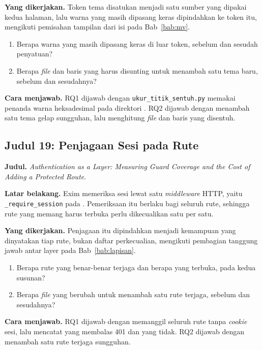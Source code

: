 \textbf{Yang dikerjakan.} Token tema disatukan menjadi satu sumber yang
dipakai kedua halaman, lalu warna yang masih dipasang keras dipindahkan ke
token itu, mengikuti pemisahan tampilan dari isi pada Bab~\ref{bab:mv}.

\begin{enumerate}
  \item Berapa warna yang masih dipasang keras di luar token, sebelum dan
    sesudah penyatuan?
  \item Berapa \textit{file} dan baris yang harus disunting untuk menambah satu tema
    baru, sebelum dan sesudahnya?
\end{enumerate}

\textbf{Cara menjawab.} RQ1 dijawab dengan \texttt{ukur\_titik\_sentuh.py}
memakai penanda warna heksadesimal pada direktori . RQ2 dijawab
dengan menambah satu tema gelap sungguhan, lalu menghitung \textit{file} dan baris
yang disentuh.

\subsection*{Judul 19: Penjagaan Sesi pada Rute}

\textbf{Judul.} \textit{Authentication as a Layer: Measuring Guard Coverage
and the Cost of Adding a Protected Route}.

\textbf{Latar belakang.} Exim memeriksa sesi lewat satu \textit{middleware}
HTTP, yaitu \texttt{\_require\_session} pada .
Pemeriksaan itu berlaku bagi seluruh rute, sehingga rute yang memang harus
terbuka perlu dikecualikan satu per satu.

\textbf{Yang dikerjakan.} Penjagaan itu dipindahkan menjadi kemampuan yang
dinyatakan tiap rute, bukan daftar perkecualian, mengikuti pembagian tanggung
jawab antar layer pada Bab~\ref{bab:lapisan}.

\begin{enumerate}
  \item Berapa rute yang benar-benar terjaga dan berapa yang terbuka, pada
    kedua susunan?
  \item Berapa \textit{file} yang berubah untuk menambah satu rute terjaga, sebelum
    dan sesudahnya?
\end{enumerate}

\textbf{Cara menjawab.} RQ1 dijawab dengan memanggil seluruh rute tanpa
\textit{cookie} sesi, lalu mencatat yang membalas 401 dan yang tidak. RQ2
dijawab dengan menambah satu rute terjaga sungguhan.

